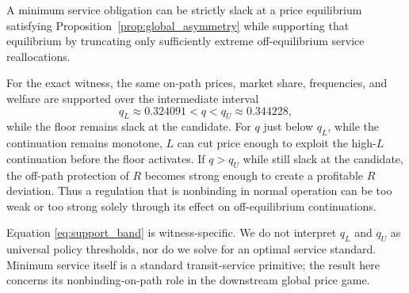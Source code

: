 \begin{proposition}\label{prop:slack_floor}
A minimum service obligation can be strictly slack at a price equilibrium satisfying Proposition~\ref{prop:global_asymmetry} while supporting that equilibrium by truncating only sufficiently extreme off-equilibrium service reallocations.
\end{proposition}

For the exact witness, the same on-path prices, market share, frequencies, and welfare are supported over the intermediate interval
\begin{equation}
q_L\approx0.324091<q<q_U\approx0.344228,
\label{eq:support_band}
\end{equation}
while the floor remains slack at the candidate. For $q$ just below $q_L$, while the continuation remains monotone, $L$ can cut price enough to exploit the high-$L$ continuation before the floor activates. If $q>q_U$ while still slack at the candidate, the off-path protection of $R$ becomes strong enough to create a profitable $R$ deviation. Thus a regulation that is nonbinding in normal operation can be too weak or too strong solely through its effect on off-equilibrium continuations.

Equation \eqref{eq:support_band} is witness-specific. We do not interpret $q_L$ and $q_U$ as universal policy thresholds, nor do we solve for an optimal service standard. Minimum service itself is a standard transit-service primitive; the result here concerns its nonbinding-on-path role in the downstream global price game.
